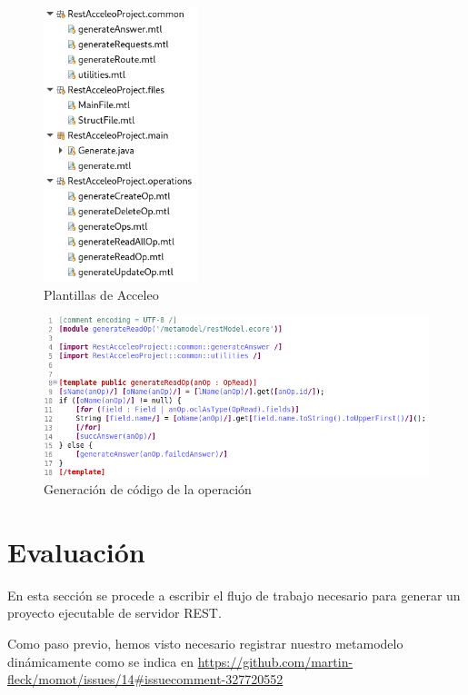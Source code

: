 \documentclass[runningheads]{llncs}
\begin{document}
\begin{figure}
    \centering
    \includegraphics[width=0.4\textwidth]{acceleo-files}
    \caption{Plantillas de Acceleo}
    \label{fig:acceleo-files}
\end{figure}

\begin{figure}
    \centering
    \includegraphics[width=\textwidth]{generateReadOp}
    \caption{Generación de código de la operación \READ}
    \label{fig:gen-read}
\end{figure}

\section{Evaluación}
\label{sc:eval}

En esta sección se procede a escribir el flujo de trabajo necesario para generar un proyecto ejecutable de servidor REST.

Como paso previo, hemos visto necesario registrar nuestro metamodelo dinámicamente como se indica en \url{https://github.com/martin-fleck/momot/issues/14\#issuecomment-327720552} 
\end{document}
